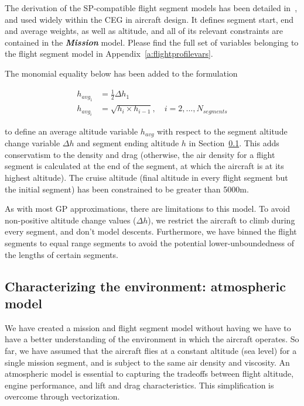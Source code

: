 The derivation of the \gls{SP}-compatible flight segment models has been detailed in~\cite{sp_ac_design},
and used widely within the \gls{CEG} in aircraft design.
It defines segment start, end and average weights,
as well as altitude, and all of its relevant constraints are contained in the \textbf{\textit{Mission}}
model. Please find the full set of variables belonging to the flight segment model in Appendix~\ref{a:flightprofilevars}.

The monomial equality below has been added to the formulation

\begin{align}
    h_{{avg}_1} &= \frac{1}{2}\Delta h_1 \\
    h_{{avg}_i} &= \sqrt{h_{i} \times h_{i-1}}, \quad i = 2,...,N_{segments}
\end{align}

to define an average altitude variable $h_{avg}$ with respect to the segment altitude change variable $\Delta h$
and segment ending altitude $h$
in Section~\ref{s:atmos}. This adds
conservatism to the density and drag (otherwise, the air density for a flight segment is calculated
at the end of the segment, at which the aircraft is at its highest altitude).
The cruise altitude (final altitude in every flight segment but the initial segment) has been constrained
to be greater than 5000m.

As with most \gls{GP} approximations, there are limitations to this model. To avoid non-positive
altitude change values ($\Delta h$), we restrict the aircraft to climb during every segment, and
don't model descents. Furthermore, we have binned the flight segments to equal range segments to
avoid the potential lower-unboundedness of the lengths of certain segments.

\subsection{Characterizing the environment: atmospheric model}
\label{s:atmos}

We have created a mission and flight segment model without having we have to have a better understanding
of the environment in which the aircraft operates. So far, we have assumed that
the aircraft flies at a constant altitude (sea level) for a single mission segment,
and is subject to the same air density and viscosity.
An atmospheric model is essential to capturing the tradeoffs between flight altitude, engine performance,
and lift and drag characteristics.
This simplification is overcome through vectorization.

